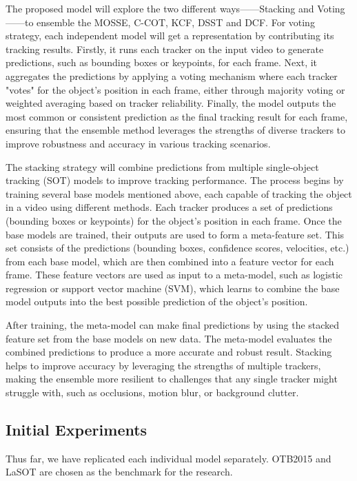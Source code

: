 \documentclass{article}
\begin{document}
The proposed model will explore the two different ways——Stacking and Voting——to ensemble the MOSSE, C-COT, KCF, DSST and DCF.
For voting strategy, each independent model will get a representation by contributing its tracking results. Firstly, it runs each tracker on the input video to generate predictions, such as bounding boxes or keypoints, for each frame. Next, it aggregates the predictions by applying a voting mechanism where each tracker "votes" for the object's position in each frame, either through majority voting or weighted averaging based on tracker reliability. Finally, the model outputs the most common or consistent prediction as the final tracking result for each frame, ensuring that the ensemble method leverages the strengths of diverse trackers to improve robustness and accuracy in various tracking scenarios.

The stacking strategy will combine predictions from multiple single-object tracking (SOT) models to improve tracking performance. The process begins by training several base models mentioned above, each capable of tracking the object in a video using different methods. Each tracker produces a set of predictions (bounding boxes or keypoints) for the object's position in each frame.
Once the base models are trained, their outputs are used to form a meta-feature set. This set consists of the predictions (bounding boxes, confidence scores, velocities, etc.) from each base model, which are then combined into a feature vector for each frame. These feature vectors are used as input to a meta-model, such as logistic regression or support vector machine (SVM), which learns to combine the base model outputs into the best possible prediction of the object's position.

After training, the meta-model can make final predictions by using the stacked feature set from the base models on new data. The meta-model evaluates the combined predictions to produce a more accurate and robust result. Stacking helps to improve accuracy by leveraging the strengths of multiple trackers, making the ensemble more resilient to challenges that any single tracker might struggle with, such as occlusions, motion blur, or background clutter.

\subsection{Initial Experiments}

Thus far, we have replicated each individual model separately. OTB2015 and LaSOT are chosen as the benchmark for the research.
\end{document}
